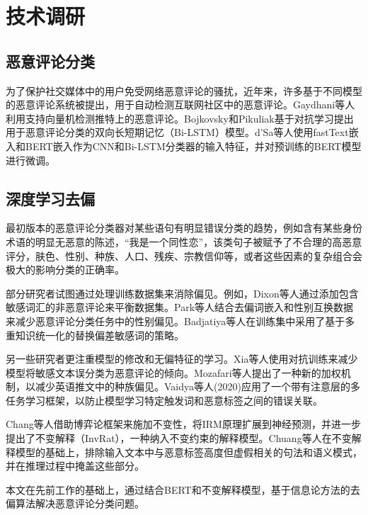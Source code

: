 \section{技术调研} %

\subsection{恶意评论分类}

为了保护社交媒体中的用户免受网络恶意评论的骚扰，近年来，许多基于不同模型的恶意评论系统被提出，用于自动检测互联网社区中的恶意评论。Gaydhani\cite{gaydhani2018detecting}等人利用支持向量机检测推特上的恶意评论。Bojkovsky和Pikuliak\cite{bojkovsky2019stufiit}基于对抗学习提出用于恶意评论分类的双向长短期记忆（Bi-LSTM）模型。d'Sa\cite{d2020bert}等人使用fastText嵌入和BERT嵌入作为CNN和Bi-LSTM分类器的输入特征，并对预训练的BERT模型进行微调。

\subsection{深度学习去偏}

最初版本的恶意评论分类器对某些语句有明显错误分类的趋势，例如含有某些身份术语的明显无恶意的陈述，``我是一个同性恋''，该类句子被赋予了不合理的高恶意评分，肤色、性别、种族、人口、残疾、宗教信仰等，或者这些因素的复杂组合会极大的影响分类的正确率。

部分研究者试图通过处理训练数据集来消除偏见。例如，Dixon\cite{dixon2018measuring}等人通过添加包含敏感词汇的非恶意评论来平衡数据集。Park\cite{park2018reducing}等人结合去偏词嵌入和性别互换数据来减少恶意评论分类任务中的性别偏见。Badjatiya\cite{badjatiya2019stereotypical}等人在训练集中采用了基于多重知识统一化的替换偏差敏感词的策略。

另一些研究者更注重模型的修改和无偏特征的学习。Xia\cite{xia2020demoting}等人使用对抗训练来减少模型将敏感文本误分类为恶意评论的倾向。Mozafari\cite{mozafari2020hate}等人提出了一种新的加权机制，以减少英语推文中的种族偏见。Vaidya\cite{vaidya2020empirical}等人(2020)应用了一个带有注意层的多任务学习框架，以防止模型学习特定触发词和恶意标签之间的错误关联。

Chang\cite{chang2020invariant}等人借助博弈论框架来施加不变性，将IRM原理扩展到神经预测，并进一步提出了不变解释（InvRat），一种纳入不变约束的解释模型。Chuang\cite{chuang2021mitigating}等人在不变解释模型的基础上，排除输入文本中与恶意标签高度但虚假相关的句法和语义模式，并在推理过程中掩盖这些部分。

本文在先前工作的基础上，通过结合BERT和不变解释模型，基于信息论方法的去偏算法解决恶意评论分类问题。
